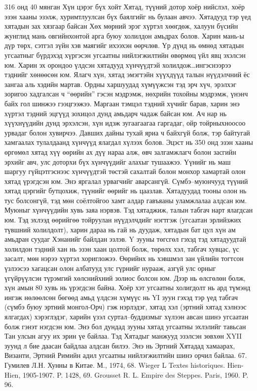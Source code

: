 316 онд 40 мянган Хүн цэрэг бүх хойт Хятад, түүний дотор хоёр нийслэл, хоёр эзэн хааны эзэлж, хуримтлуулсан бүх баялгийг нь булаан авчээ. Хятадууд тэр үед хятадын зах хязгаар байсан Хөх мөрний эрэг хүртэл хөөгдөж, халуун бүсийн жунглид мань овгийнхонтой арга буюу холилдон амьдрах болов. Харин мань-ы дүр төрх, сэтгэл зүйн хэв маягийг ихээхэн өөрчлөв. Үр дүнд нь өмнөд хятадын угсаатныг бүрдэхэд хүргэсэн угсаатны нийлэгжилтийн өвөрмөц үйл явц эхэлсэн юм. Харин эх орондоо үлдсэн хятадууд хүнчүүдтэй холилдож…ингэснээрээ тэднийг хөнөөсөн юм. Ялагч хүн, хятад эмэгтэйн хүүхдүүд талын нүүдэлчний ёс зангаа аль хэдийн мартав. Ордны харшуудад хүмүүжсэн тэд эрч хүч, эрэлхэг зоригоо хадгалсан ч “өөрийн” гэсэн мэдрэмж, нөхрийн тохойны мэдрэмж, үнэнч байх гол шинжээ гээцгээжээ. Маргаан тэмцэл тэдний хүчийг барав, харин энэ хүртэл тэдний эцгүүд зохицол дунд амьдарч чадаж байсан юм. Ач нар нь хүүхнүүдийн дунд эрхэлсэн, хүн идэж зугаагаагаа гаргадаг, ойр тойрныхноосоо урвадаг болон хувирчээ. Давших дайны тухай яриа ч байхгүй болж, тэр байтугай хамгаалах тулалдаанд хүнчүүд ялагдал хүлээх болов. Эцэст нь 350 онд эзэн хааны өргөмөл хятад хүү өөрийн ах дүү нараа алж, өвч залгамжлагч болон засгийн эрхийг авч, улс доторхи бүх хүнчүүдийг алахыг тушаажээ. Үүнийг нь маш шаргуу гүйцэтгэснээс хүнчүүдтэй төстэй сахалтай болон монхор хамартай олон хятад үрэгдсэн юм.
Энэ яргалал урвагчийг аварсангүй. Сүмбэ–муюнчууд түүний хятад цэргийг бутцохиж, түүнийг өөрийг нь цаазлав. Хятадуудад тооны олон нь тус болсонгүй, тэд мөн соёлтойгоо хамт алдар гавъяаны уламжлалаа алдсан юм. Муюныг хүнчүүдийн хувь заяа нэрвэв. Тэд хятаджиж, талын табгач нарт ялагдсан юм. Тэд эхлээд өөрийгөө тойруулан нүүдэлчдийг нэгтгэж (угсаатан эрлийзжих түвшний холилдолт), харин дараа нь гай нь дуудаж, хятадын бат цул хүн ам амьдран суудаг Хэнанийг байлдан эзлэв. Y зууны төгсгөл гэхэд тэд хятадуудтай холилдон тэдний хан нь эзэн хаан цолтой болж, төрөлх хэл, табгач хувцас, үс засалт, мөн нэрээ хүртэл хоригложээ. Өөрийнх нь хэвшмэл зан үйлийн тогтсон үзлээсээ хагацсан олон албатууд улс гүрнийг нурааж, азгүй улс орныг үгүйрүүлсэн түрэмгий хөлснийхний золиос болсон юм. Дээр нь өлсгөлөн болж, хүн амын 80 хувь нь үрэгдсэн байна. Хоёр хэт угсаатны холигдолт нь ард түмэнд ингэж нөлөөлсөн бөгөөд амьд үлдсэн хүмүүс нь YI зуун гэхэд тэр үед табгач (сүмбэ буюу эртний монгол-Орч) гэж нэрлэдэг, хятад хэл (эртний хятад хэлнээс ялгагдах) хэрэглэдэг, харийн үзэл суртал–буддизмыг хүлээн авсан шинэ угсаатан болж гэнэт нэгдсэн юм. Энэ бол дундад зууны хятад угсаатны эхлэлийг тавьсан Тан улсын агуу их эрин үе байлаа. Тэд Хятадыг манжууд эзэлсэн зөвхөн XYII зуунд л бие даасан байдлаа алдсан билээ. Энэ нь Эртний Хятадад хамаарах, Византи, Эртний Римийн адил угсаатны нийлэгжилтийн шинэ орчил байлаа. 67. Гумилев Л.Н. Хунны в Китае. М., 1974, 68. Wieger L Textes historiques. Hien-Hien, 1905-1907. P. 1428, 69. Grousset R. L. Empire des Steppes. Paris, 1960. P. 96.
